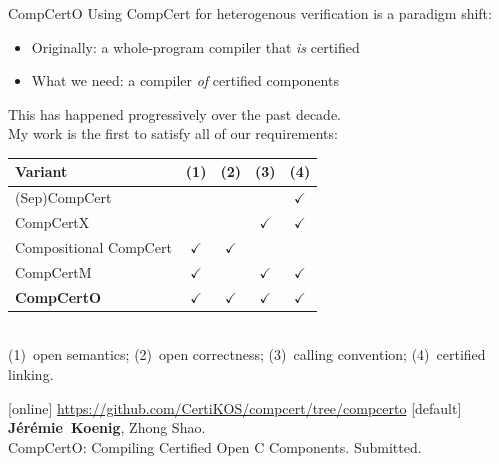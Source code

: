 \documentclass[aspectratio=141]{beamer}
\newcommand{\fme}{\textbf{J\'er\'emie~Koenig}}
\begin{document}
\begin{frame}{CompCertO} %
  Using CompCert for heterogenous verification
  is a paradigm shift:
  \begin{itemize}
    \item Originally: a whole-program compiler that \emph{is} certified
    \item What we need: a compiler \emph{of} certified components
  \end{itemize}
  \pause
  This has happened progressively over the past decade. \\
  My work is the first to satisfy all of our requirements:
  \begin{center}
    \small
    \begin{tabular}{l@{\qquad}cccc}
      \hline
      Variant & (1) & (2) & (3) & (4) \\
      \hline
      (Sep)CompCert &
        & & & $\checkmark$ \\
      CompCertX &
        & & $\checkmark$ & $\checkmark$ \\
      Compositional CompCert &
        $\checkmark$ & $\checkmark$ & & \\
      CompCertM &
        $\checkmark$ & & $\checkmark$ & $\checkmark$ \\
      \bf CompCertO &
        $\checkmark$&$\checkmark$&$\checkmark$&$\checkmark$ \\
      \hline
    \end{tabular}
    \\ \tiny
    (1)~open semantics;
    (2)~open correctness;
    (3)~calling convention;
    (4)~certified linking.
  \end{center}
  \begin{thebibliography}{10}
    [online]
      \url{https://github.com/CertiKOS/compcert/tree/compcerto}
    [default]
      \fme, Zhong Shao.
      \newblock \\
      CompCertO: Compiling Certified Open C Components.
      \newblock
      Submitted.
  \end{thebibliography}
\end{frame}

\end{document}
